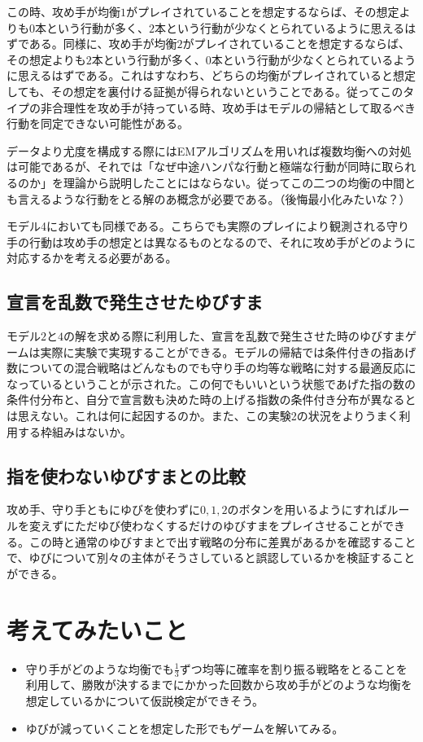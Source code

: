 \documentclass{jsarticle}
\begin{document}
この時、攻め手が均衡$1$がプレイされていることを想定するならば、その想定よりも$0$本という行動が多く、$2$本という行動が少なくとられているように思えるはずである。同様に、攻め手が均衡$2$がプレイされていることを想定するならば、その想定よりも$2$本という行動が多く、$0$本という行動が少なくとられているように思えるはずである。これはすなわち、どちらの均衡がプレイされていると想定しても、その想定を裏付ける証拠が得られないということである。従ってこのタイプの非合理性を攻め手が持っている時、攻め手はモデルの帰結として取るべき行動を同定できない可能性がある。

データより尤度を構成する際にはEMアルゴリズムを用いれば複数均衡への対処は可能であるが、それでは「なぜ中途ハンパな行動と極端な行動が同時に取られるのか」を理論から説明したことにはならない。従ってこの二つの均衡の中間とも言えるような行動をとる解のあ概念が必要である。（後悔最小化みたいな？）

モデル4においても同様である。こちらでも実際のプレイにより観測される守り手の行動は攻め手の想定とは異なるものとなるので、それに攻め手がどのように対応するかを考える必要がある。

\subsection{宣言を乱数で発生させたゆびすま}
モデル$2$と$4$の解を求める際に利用した、宣言を乱数で発生させた時のゆびすまゲームは実際に実験で実現することができる。モデルの帰結では条件付きの指あげ数についての混合戦略はどんなものでも守り手の均等な戦略に対する最適反応になっているということが示された。この何でもいいという状態であげた指の数の条件付分布と、自分で宣言数も決めた時の上げる指数の条件付き分布が異なるとは思えない。これは何に起因するのか。また、この実験2の状況をよりうまく利用する枠組みはないか。

\subsection{指を使わないゆびすまとの比較}
攻め手、守り手ともにゆびを使わずに$0,1,2$のボタンを用いるようにすればルールを変えずにただゆび使わなくするだけのゆびすまをプレイさせることができる。この時と通常のゆびすまとで出す戦略の分布に差異があるかを確認することで、ゆびについて別々の主体がそうさしていると誤認しているかを検証することができる。

\section{考えてみたいこと}
\begin{itemize}
	\item 守り手がどのような均衡でも$\frac{1}{3}$ずつ均等に確率を割り振る戦略をとることを利用して、勝敗が決するまでにかかった回数から攻め手がどのような均衡を想定しているかについて仮説検定ができそう。
	\item ゆびが減っていくことを想定した形でもゲームを解いてみる。
\end{itemize}
\end{document}
